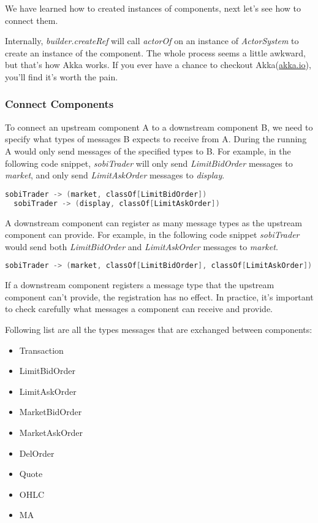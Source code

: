 We have learned how to created instances of components, next let's see how to connect them.

\begin{info}
Internally, \emph{builder.createRef} will call \emph{actorOf} on an instance of \emph{ActorSystem} to create an instance of the component. The whole process seems a little awkward, but that's how Akka works. If you ever have a chance to checkout Akka(\href{http://akka.io}{akka.io}), you'll find it's worth the pain.
\end{info}

\subsubsection{Connect Components}

To connect an upstream component A to a downstream component B, we need to specify what types of messages B expects to receive from A. During the running A would only send messages of the specified types to B. For example, in the following code snippet, \emph{sobiTrader} will only send \emph{LimitBidOrder} messages to \emph{market}, and only send \emph{LimitAskOrder} messages to \emph{display}.

\begin{lstlisting}[language=Scala]
  sobiTrader -> (market, classOf[LimitBidOrder])
  sobiTrader -> (display, classOf[LimitAskOrder])
\end{lstlisting}

A downstream component can register as many message types as the upstream component can provide. For example, in the following code snippet \emph{sobiTrader} would send both \emph{LimitBidOrder} and \emph{LimitAskOrder} messages to \emph{market}.

\begin{lstlisting}[language=Scala]
  sobiTrader -> (market, classOf[LimitBidOrder], classOf[LimitAskOrder])
\end{lstlisting}

If a downstream component registers a message type that the upstream component can't provide, the registration has no effect. In practice, it's important to check carefully what messages a component can receive and provide.

Following list are all the types messages that are exchanged between components:

\begin{itemize}
\item Transaction
\item LimitBidOrder
\item LimitAskOrder
\item MarketBidOrder
\item MarketAskOrder
\item DelOrder
\item Quote
\item OHLC
\item MA
\end{itemize}

